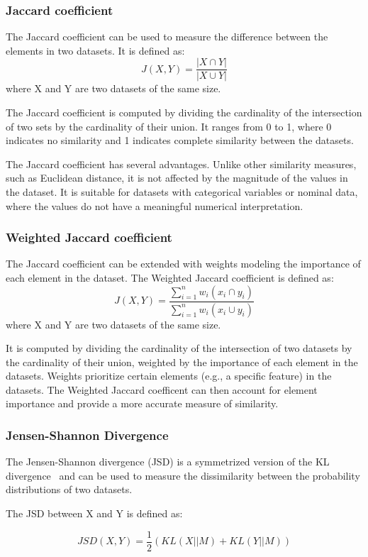 \subsubsection{Jaccard coefficient}
The Jaccard coefficient can be used to measure the difference between the elements in two datasets.
It is defined as:\[J(X,Y) = \frac{|X \cap Y|}{|X \cup Y|}\]
where X and Y are two datasets of the same size.

The Jaccard coefficient is computed by dividing the cardinality of the intersection of two sets by the cardinality of their union. It ranges from 0 to 1, where 0 indicates no similarity and 1 indicates complete similarity between the datasets.

The Jaccard coefficient has several advantages. Unlike other similarity measures, such as Euclidean distance, it is not affected by the magnitude of the values in the dataset. It is suitable for datasets with categorical variables or nominal data, where the values do not have a meaningful numerical interpretation.

\subsubsection{Weighted Jaccard coefficient}
The Jaccard coefficient can be extended with weights modeling the importance of each element in the dataset.
The Weighted Jaccard coefficient is defined as:\[J(X,Y) = \frac{\sum_{i=1}^{n}w_i(x_i \cap y_i)}{\sum_{i=1}^{n}w_i(x_i \cup y_i)}\]
where X and Y are two datasets of the same size.

It is computed by dividing the cardinality of the intersection of two datasets by the cardinality of their union, weighted by the importance of each element in the datasets. Weights prioritize certain elements (e.g., a specific feature) in the datasets.
The Weighted Jaccard coefficent can then account for element importance and provide a more accurate measure of similarity.

\subsubsection{Jensen-Shannon Divergence}
The Jensen-Shannon divergence (JSD) is a symmetrized version of the KL divergence~\cite{ADD} and can be used to measure the dissimilarity between the probability distributions of two datasets.

The JSD between X and Y  is defined as:

\[JSD(X, Y) = \frac{1}{2} \left( KL(X || M)
  + KL(Y || M) \right)\]

